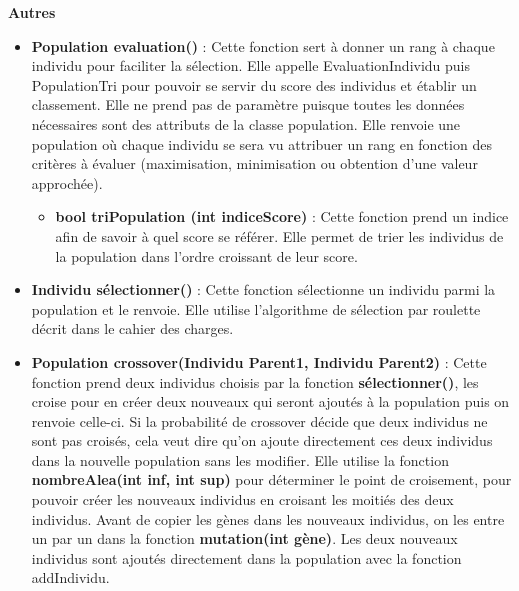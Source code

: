\documentclass[a4paper,11pt]{article}
\begin{document}
			\textbf{Autres}
				\begin{itemize}
							\item \textbf{Population evaluation()} : Cette fonction sert à donner un rang à chaque individu pour faciliter la sélection. 
								Elle appelle EvaluationIndividu puis PopulationTri pour pouvoir se servir du score des individus et établir un classement. 
								Elle ne prend pas de paramètre puisque toutes les données nécessaires sont des attributs de la classe population. 
								Elle renvoie une population où chaque individu se sera vu attribuer un rang en fonction des critères à évaluer (maximisation, minimisation ou obtention d’une valeur approchée).\vspace{0.2cm}
								\begin{itemize}
								\item \textbf{bool triPopulation (int indiceScore)} : Cette fonction prend un indice afin de savoir à quel score se référer. 
									Elle permet de trier les individus de la population dans l’ordre croissant de leur score.\vspace{0.2cm}
								\end{itemize}
							
							\item \textbf{Individu sélectionner()} : Cette fonction sélectionne un individu parmi la population et le renvoie. 
								Elle utilise l’algorithme de sélection par roulette décrit dans le cahier des charges.\vspace{0.2cm}
								
							\item \textbf{Population crossover(Individu Parent1, Individu Parent2)} : Cette fonction prend deux individus choisis par la fonction \textbf{sélectionner()}, les croise pour en créer deux nouveaux qui seront ajoutés à la population puis on renvoie celle-ci. 
							Si la probabilité de crossover décide que deux individus ne sont pas croisés, cela veut dire qu’on ajoute directement ces deux individus dans la nouvelle population sans les modifier. 
								Elle utilise la fonction \textbf{nombreAlea(int inf, int sup)} pour déterminer le point de croisement, pour pouvoir créer les nouveaux individus en croisant les moitiés des deux individus.
								Avant de copier les gènes dans les nouveaux individus, on les entre un par un dans la fonction \textbf{mutation(int gène)}. 
								Les deux nouveaux individus sont ajoutés directement dans la population  avec la fonction addIndividu.\vspace{0.2cm}
							

\end{itemize}
\end{document}
